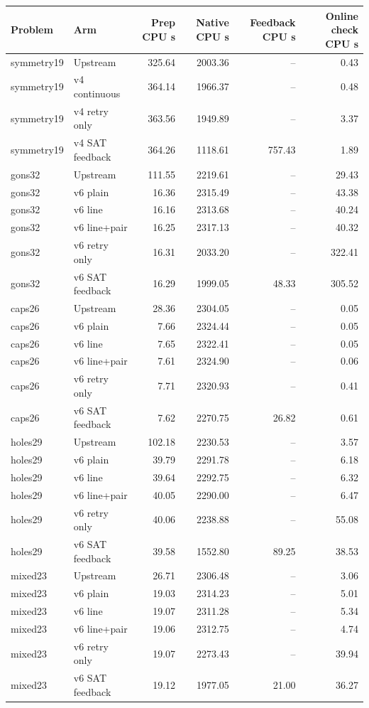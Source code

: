 \documentclass[10pt,a4paper]{article}
\begin{document}
\begin{center}\small\begin{longtable}{llrrrr}
\toprule
Problem & Arm & Prep CPU s & Native CPU s & Feedback CPU s & Online check CPU s \\
\midrule\endhead
symmetry19 & Upstream & 325.64 & 2003.36 & -- & 0.43 \\
symmetry19 & v4 continuous & 364.14 & 1966.37 & -- & 0.48 \\
symmetry19 & v4 retry only & 363.56 & 1949.89 & -- & 3.37 \\
symmetry19 & v4 SAT feedback & 364.26 & 1118.61 & 757.43 & 1.89 \\
gons32 & Upstream & 111.55 & 2219.61 & -- & 29.43 \\
gons32 & v6 plain & 16.36 & 2315.49 & -- & 43.38 \\
gons32 & v6 line & 16.16 & 2313.68 & -- & 40.24 \\
gons32 & v6 line+pair & 16.25 & 2317.13 & -- & 40.32 \\
gons32 & v6 retry only & 16.31 & 2033.20 & -- & 322.41 \\
gons32 & v6 SAT feedback & 16.29 & 1999.05 & 48.33 & 305.52 \\
caps26 & Upstream & 28.36 & 2304.05 & -- & 0.05 \\
caps26 & v6 plain & 7.66 & 2324.44 & -- & 0.05 \\
caps26 & v6 line & 7.65 & 2322.41 & -- & 0.05 \\
caps26 & v6 line+pair & 7.61 & 2324.90 & -- & 0.06 \\
caps26 & v6 retry only & 7.71 & 2320.93 & -- & 0.41 \\
caps26 & v6 SAT feedback & 7.62 & 2270.75 & 26.82 & 0.61 \\
holes29 & Upstream & 102.18 & 2230.53 & -- & 3.57 \\
holes29 & v6 plain & 39.79 & 2291.78 & -- & 6.18 \\
holes29 & v6 line & 39.64 & 2292.75 & -- & 6.32 \\
holes29 & v6 line+pair & 40.05 & 2290.00 & -- & 6.47 \\
holes29 & v6 retry only & 40.06 & 2238.88 & -- & 55.08 \\
holes29 & v6 SAT feedback & 39.58 & 1552.80 & 89.25 & 38.53 \\
mixed23 & Upstream & 26.71 & 2306.48 & -- & 3.06 \\
mixed23 & v6 plain & 19.03 & 2314.23 & -- & 5.01 \\
mixed23 & v6 line & 19.07 & 2311.28 & -- & 5.34 \\
mixed23 & v6 line+pair & 19.06 & 2312.75 & -- & 4.74 \\
mixed23 & v6 retry only & 19.07 & 2273.43 & -- & 39.94 \\
mixed23 & v6 SAT feedback & 19.12 & 1977.05 & 21.00 & 36.27 \\
\bottomrule\end{longtable}\end{center}
\end{document}
